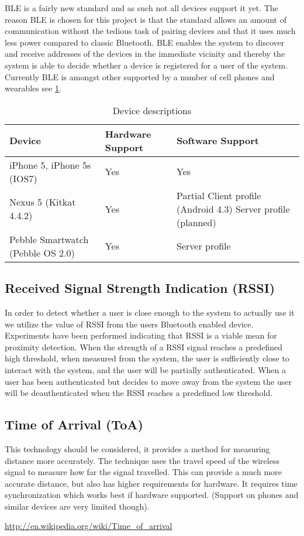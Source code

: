 BLE is a fairly new standard and as such not all devices support it yet.
The reason BLE is chosen for this project is that the standard allows an amount of communication without the tedious task of pairing devices and that it uses much less power compared to classic Bluetooth.
BLE enables the system to discover and receive addresses of the devices in the immediate vicinity and thereby the system is able to decide whether a device is registered for a user of the system.
Currently BLE is amongst other supported by a number of cell phones and wearables see \cref{table:Devices}.

\begin{table}[!t]
\caption{Device descriptions}
\label{table:Devices}
\centering
\begin{tabular}{|p{2.3cm}|p{1.3cm}|p{3.8cm}|}
\hline
\textbf{Device} & \textbf{Hardware Support} & \textbf{Software Support}\\
\hline
iPhone 5, iPhone 5s (IOS7) & Yes & Yes\\
\hline
Nexus 5 (Kitkat 4.4.2) & Yes & Partial \newline
Client profile (Android 4.3)
Server profile (planned)\\
\hline
Pebble Smartwatch (Pebble OS 2.0) & Yes & Server profile\\
\hline
\end{tabular}
\end{table}

\subsection{Received Signal Strength Indication (RSSI)}

In order to detect whether a user is close enough to the system to actually use it we utilize the value of RSSI from the users Bluetooth enabled device.
Experiments have been performed indicating that RSSI is a viable mean for proximity detection\cite{ref:Takashi}.
When the strength of a RSSI signal reaches a predefined high threshold, when measured from the system, the user is sufficiently close to interact with the system, and the user will be partially authenticated.
When a user has been authenticated but decides to move away from the system the user will be deauthenticated when the RSSI reaches a predefined low threshold.

\subsection{Time of Arrival (ToA)} %
This technology should be considered, it provides a method for measuring distance more accurately.
The technique uses the travel speed of the wireless signal to measure how far the signal travelled.
This can provide a much more accurate distance, but also has higher requirements for hardware.
It requires time synchronization which works best if hardware supported. (Support on phones and similar devices are very limited though). %

\url{http://en.wikipedia.org/wiki/Time_of_arrival}

